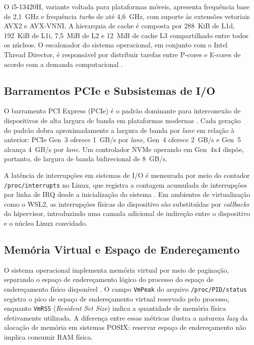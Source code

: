 \documentclass[12pt]{article}
\begin{document}
O i5-13420H, variante voltada para plataformas móveis, apresenta frequência base de 2,1~GHz e frequência \textit{turbo} de até 4,6~GHz, com suporte às extensões vetoriais AVX2 e AVX-VNNI. A hierarquia de cache é composta por 288~KiB de L1d, 192~KiB de L1i, 7,5~MiB de L2 e 12~MiB de cache L3 compartilhado entre todos os núcleos. O escalonador do sistema operacional, em conjunto com o Intel Thread Director, é responsável por distribuir tarefas entre P-cores e E-cores de acordo com a demanda computacional \cite{intel2022threaddir}.

\subsection{Barramentos PCIe e Subsistemas de I/O}

O barramento PCI Express (PCIe) é o padrão dominante para interconexão de dispositivos de alta largura de banda em plataformas modernas \cite{budruk2003}. Cada geração do padrão dobra aproximadamente a largura de banda por \textit{lane} em relação à anterior: PCIe Gen~3 oferece 1~GB/s por \textit{lane}, Gen~4 oferece 2~GB/s e Gen~5 alcança 4~GB/s por \textit{lane}. Um controlador NVMe operando em Gen~4x4 dispõe, portanto, de largura de banda bidirecional de 8~GB/s.

A latência de interrupções em sistemas de I/O é mensurada por meio do contador \texttt{/proc/interrupts} no Linux, que registra a contagem acumulada de interrupções por linha de IRQ desde a inicialização do sistema \cite{love2010linux}. Em ambientes de virtualização como o WSL2, as interrupções físicas do dispositivo são substituídas por \textit{callbacks} do hipervisor, introduzindo uma camada adicional de indireção entre o dispositivo e o núcleo Linux convidado.

\subsection{Memória Virtual e Espaço de Endereçamento}

O sistema operacional implementa memória virtual por meio de paginação, separando o espaço de endereçamento lógico do processo do espaço de endereçamento físico disponível \cite{tanenbaum2015}. O campo \texttt{VmPeak} do arquivo \texttt{/proc/PID/status} registra o pico de espaço de endereçamento virtual reservado pelo processo, enquanto \texttt{VmRSS} (\textit{Resident Set Size}) indica a quantidade de memória física efetivamente utilizada. A diferença entre essas métricas ilustra a natureza \textit{lazy} da alocação de memória em sistemas POSIX: reservar espaço de endereçamento não implica consumir RAM física.
\end{document}
